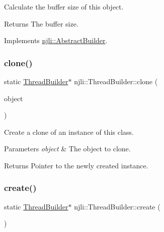 Calculate the buffer size of this object.

\begin{DoxyReturn}{Returns}
The buffer size. 
\end{DoxyReturn}


Implements \mbox{\hyperlink{classnjli_1_1_abstract_builder_aa1d220053e182c37b31b427499c6eacf}{njli\+::\+Abstract\+Builder}}.

\mbox{\label{classnjli_1_1_thread_builder_a6accf6a772f344091930e2004ea4038d}} 
\subsubsection{\texorpdfstring{clone()}{clone()}}
{\footnotesize\ttfamily static \mbox{\hyperlink{classnjli_1_1_thread_builder}{Thread\+Builder}}$\ast$ njli\+::\+Thread\+Builder\+::clone (\begin{DoxyParamCaption}\item[{const \mbox{\hyperlink{classnjli_1_1_thread_builder}{Thread\+Builder}} \&}]{object }\end{DoxyParamCaption})\hspace{0.3cm}{\ttfamily [static]}}

Create a clone of an instance of this class.


\begin{DoxyParams}{Parameters}
{\em object} & The object to clone.\\
\hline
\end{DoxyParams}
\begin{DoxyReturn}{Returns}
Pointer to the newly created instance. 
\end{DoxyReturn}
\mbox{\label{classnjli_1_1_thread_builder_af9d34834b3e1c597062aa8ba3cc9202a}} 
\subsubsection{\texorpdfstring{create()}{create()}}
{\footnotesize\ttfamily static \mbox{\hyperlink{classnjli_1_1_thread_builder}{Thread\+Builder}}$\ast$ njli\+::\+Thread\+Builder\+::create (\begin{DoxyParamCaption}{ }\end{DoxyParamCaption})\hspace{0.3cm}{\ttfamily [static]}}

